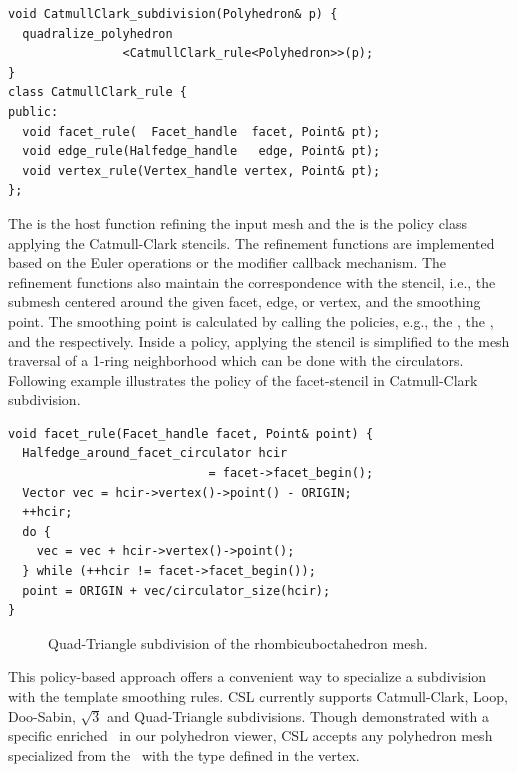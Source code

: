 \begin{lstlisting}
void CatmullClark_subdivision(Polyhedron& p) {    
  quadralize_polyhedron
                <CatmullClark_rule<Polyhedron>>(p);  
}
class CatmullClark_rule {
public:
  void facet_rule(  Facet_handle  facet, Point& pt);
  void edge_rule(Halfedge_handle   edge, Point& pt);
  void vertex_rule(Vertex_handle vertex, Point& pt);
};
\end{lstlisting}
\noindent The  
is the host function refining the input mesh
and the  is the policy 
class applying the Catmull-Clark stencils.
The refinement functions are implemented based on the
Euler operations or the modifier callback mechanism.
The refinement functions also maintain the 
correspondence with the stencil, i.e., the submesh 
centered around the given facet, edge, or
vertex, and the smoothing point.
The smoothing point is calculated by calling the 
policies, e.g., the , the 
, and the  
respectively. Inside a policy, applying the 
stencil is simplified to the mesh traversal of a 
1-ring neighborhood which can be done with the 
circulators. Following example illustrates  
the policy of the facet-stencil in Catmull-Clark 
subdivision.
\begin{lstlisting}
void facet_rule(Facet_handle facet, Point& point) {
  Halfedge_around_facet_circulator hcir 
                            = facet->facet_begin();
  Vector vec = hcir->vertex()->point() - ORIGIN;
  ++hcir;
  do {
    vec = vec + hcir->vertex()->point();
  } while (++hcir != facet->facet_begin());
  point = ORIGIN + vec/circulator_size(hcir);
}
\end{lstlisting}

\begin{figure}[h]
    \caption{Quad-Triangle subdivision of the rhombicuboctahedron mesh.}
    \label{fig:quad-triangle}
\end{figure}

This policy-based approach offers a convenient way to
specialize a subdivision with the template smoothing rules.
CSL currently supports Catmull-Clark, 
Loop, Doo-Sabin, $\sqrt{3}$ and Quad-Triangle
subdivisions. %
Though demonstrated with a specific enriched \poly\ in our 
polyhedron viewer, CSL accepts any polyhedron mesh specialized 
from the \poly\ with the  type defined in the vertex.  

